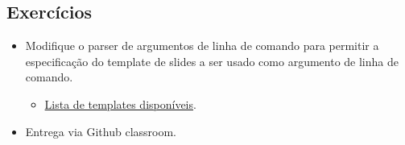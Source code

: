 \documentclass[11pt]{article}
\begin{document}
\subsection*{Exercícios}
\label{sec:org960fd16}

\begin{itemize}
\item Modifique o parser de argumentos de linha de comando para permitir a especificação do
template de slides a ser usado como argumento de linha de comando.
\begin{itemize}
\item \href{https://latex-beamer.com/tutorials/beamer-themes/}{Lista de templates disponíveis}.
\end{itemize}
\item Entrega via Github classroom.
\end{itemize}
\end{document}
